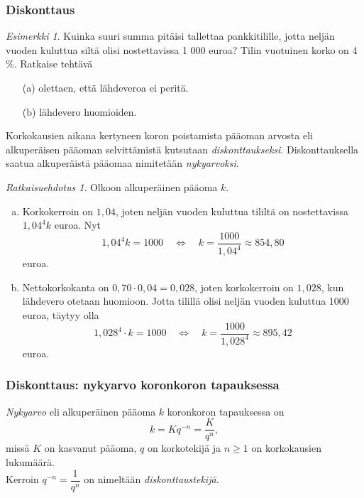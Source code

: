 \documentclass[]{beamer}\usepackage[]{graphicx}\usepackage[]{color}
\theoremstyle{remark}
\newtheorem{esim}{Esimerkki}
\newtheorem{ratkaisu}{Ratkaisuehdotus}
\newcommand{\pblock}{\\ \vspace{0.5cm}\pause}
\begin{document}
\begin{frame}
    \frametitle{Diskonttaus}
    \pause
    \begin{esim}
        Kuinka suuri summa pitäisi tallettaa pankkitilille, jotta neljän vuoden kuluttua siltä olisi nostettavissa 1 000 euroa? 
        Tilin vuotuinen korko on 4 \%. Ratkaise tehtävä
        \begin{enumerate}
            \item[(a)] olettaen, että lähdeveroa ei peritä.
            \item[(b)] lähdevero huomioiden.
        \end{enumerate}
    \end{esim}
    \pause
    Korkokausien aikana kertyneen koron poistamista pääoman arvosta eli alkuperäisen pääoman selvittämistä kutsutaan 
    \emph{diskonttaukseksi}.
    \pause
    Diskonttauksella saatua alkuperäistä pääomaa nimitetään \emph{nykyarvoksi}.
\end{frame}

\begin{frame}
    \begin{ratkaisu}
        Olkoon alkuperäinen pääoma \(k\).
        \begin{enumerate}[(a)]
            \item Korkokerroin on \(1,04\), joten neljän vuoden kuluttua tililtä on nostettavissa \(1,04^4k\) euroa. 
            \pause
                Nyt
                \[
                    1,04^4k = 1000\quad\Leftrightarrow\quad k = \frac{1000}{1,04^4}\approx 854,80
                \]
                euroa.
            \item Nettokorkokanta on \(0,70\cdot0,04=0,028\), joten korkokerroin on \(1,028\), kun lähdevero otetaan huomioon. \pause
                Jotta tilillä olisi neljän vuoden kuluttua 1000 euroa, täytyy olla
                \[
                    1,028^4\cdot k = 1000\quad\Leftrightarrow\quad k = \frac{1000}{1,028^4}\approx 895,42
                \]
                euroa.
        \end{enumerate}
    \end{ratkaisu}
\end{frame}

\begin{frame}
    \frametitle{Diskonttaus: nykyarvo koronkoron tapauksessa}
    \pause
    \begin{block}{}
        \emph{Nykyarvo} eli alkuperäinen pääoma $k$ koronkoron tapauksessa on
        \[
            k = Kq^{-n} = \frac{K}{q^n},
        \]
        missä $K$ on kasvanut pääoma, $q$ on korkotekijä ja $n \geq 1$ on korkokausien lukumäärä.
        \pblock
        Kerroin $q^{-n} = \dfrac{1}{q^n}$ on nimeltään \emph{diskonttaustekijä}.
    \end{block}
\end{frame}
\end{document}

